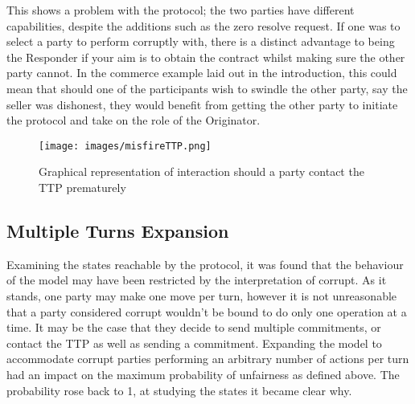 \documentclass{l4proj}
\begin{document}
This shows a problem with the protocol; the two parties have different capabilities, despite the additions such as the zero resolve request. If one was to select a party to perform corruptly with, there is a distinct advantage to being the Responder if your aim is to obtain the contract whilst making sure the other party cannot. In the commerce example laid out in the introduction, this could mean that should one of the participants wish to swindle the other party, say the seller was dishonest, they would benefit from getting the other party to initiate the protocol and take on the role of the Originator.



\begin{figure}[ht!]
\centering
\texttt{[image: images/misfireTTP.png]}
\caption{Graphical representation of interaction should a party contact the TTP prematurely}
\label{misfireTTP}
\end{figure}


\subsection{Multiple Turns Expansion} 

Examining the states reachable by the protocol, it was found that the behaviour of the model may have been restricted by the interpretation of corrupt. As it stands, one party may make one move per turn, however it is not unreasonable that a party considered corrupt wouldn't be bound to do only one operation at a time. It may be the case that they decide to send multiple commitments, or contact the TTP as well as sending a commitment. Expanding the model to accommodate corrupt parties performing an arbitrary number of actions per turn had an impact on the maximum probability of unfairness as defined above. The probability rose back to 1, at studying the states it became clear why.
\end{document}
